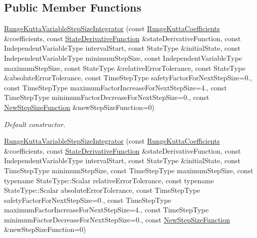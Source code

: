 \subsection*{Public Member Functions}
\begin{DoxyCompactItemize}
\item 
\hyperlink{classtudat_1_1numerical__integrators_1_1RungeKuttaVariableStepSizeIntegrator_ac50cd2ef741a2efb8803cff8b5d0283d}{Runge\+Kutta\+Variable\+Step\+Size\+Integrator} (const \hyperlink{structtudat_1_1numerical__integrators_1_1RungeKuttaCoefficients}{Runge\+Kutta\+Coefficients} \&coefficients, const \hyperlink{classtudat_1_1numerical__integrators_1_1NumericalIntegrator_a0d0a5d48ebaf1f5ad9cd7a73b44be0fc}{State\+Derivative\+Function} \&state\+Derivative\+Function, const Independent\+Variable\+Type interval\+Start, const State\+Type \&initial\+State, const Independent\+Variable\+Type minimum\+Step\+Size, const Independent\+Variable\+Type maximum\+Step\+Size, const State\+Type \&relative\+Error\+Tolerance, const State\+Type \&absolute\+Error\+Tolerance, const Time\+Step\+Type safety\+Factor\+For\+Next\+Step\+Size=0., const Time\+Step\+Type maximum\+Factor\+Increase\+For\+Next\+Step\+Size=4., const Time\+Step\+Type minimum\+Factor\+Decrease\+For\+Next\+Step\+Size=0., const \hyperlink{classtudat_1_1numerical__integrators_1_1RungeKuttaVariableStepSizeIntegrator_a7f439a647db26cafc16b08f5b2922868}{New\+Step\+Size\+Function} \&new\+Step\+Size\+Function=0)
\begin{DoxyCompactList}\small\item\em Default constructor. \end{DoxyCompactList}\item 
\hyperlink{classtudat_1_1numerical__integrators_1_1RungeKuttaVariableStepSizeIntegrator_afce25655a78ccac5a2909749351f8ccb}{Runge\+Kutta\+Variable\+Step\+Size\+Integrator} (const \hyperlink{structtudat_1_1numerical__integrators_1_1RungeKuttaCoefficients}{Runge\+Kutta\+Coefficients} \&coefficients, const \hyperlink{classtudat_1_1numerical__integrators_1_1NumericalIntegrator_a0d0a5d48ebaf1f5ad9cd7a73b44be0fc}{State\+Derivative\+Function} \&state\+Derivative\+Function, const Independent\+Variable\+Type interval\+Start, const State\+Type \&initial\+State, const Time\+Step\+Type minimum\+Step\+Size, const Time\+Step\+Type maximum\+Step\+Size, const typename State\+Type\+::\+Scalar relative\+Error\+Tolerance, const typename State\+Type\+::\+Scalar absolute\+Error\+Tolerance, const Time\+Step\+Type safety\+Factor\+For\+Next\+Step\+Size=0., const Time\+Step\+Type maximum\+Factor\+Increase\+For\+Next\+Step\+Size=4., const Time\+Step\+Type minimum\+Factor\+Decrease\+For\+Next\+Step\+Size=0., const \hyperlink{classtudat_1_1numerical__integrators_1_1RungeKuttaVariableStepSizeIntegrator_a7f439a647db26cafc16b08f5b2922868}{New\+Step\+Size\+Function} \&new\+Step\+Size\+Function=0)

\end{DoxyCompactItemize}
